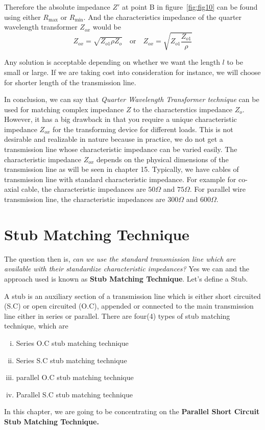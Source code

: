 Therefore the absolute impedance $Z'$ at point B in figure~\ref{fig:fig10} can be found using either $ R_\max$ or $ R_\min$. And the characteristics impedance of the quarter wavelength transformer $Z_{ox}$ would be
\begin{equation*}
Z_{ox}=\sqrt{Z_{o1}\rho Z_o}\quad\text{or}\quad Z_{ox}=\sqrt{Z_{o1}\frac{Z_{o1}}{\rho}}
\end{equation*}

Any solution is acceptable depending on whether we want the length $l$ to be small or large. If we are taking cost into consideration for instance, we will choose for shorter length of the transmission line.

In conclusion, we can say that \textit{Quarter Wavelength Transformer technique} can be used for matching complex impedance $Z$ to the characterstics impedance $Z_o$. However, it has a big drawback in that you require a unique characteristic impedance $Z_{ox}$ for the transforming device for different loads. This is not desirable and realizable in nature because in practice, we do not get a transmission line whose characteristic impedance can be varied easily. The characteristic impedance $Z_{ox}$ depends on the physical dimensions of the transmission line as will be seen in chapter 15. Typically, we have cables of transmission line with standard characteristic impedance. For example for co-axial cable, the characteristic impedances are $50\Omega$ and $75\Omega$. For parallel wire transmission line, the characteristic impedances are $300\Omega$ and $600\Omega$.

\section{Stub Matching Technique}
The question then is, \emph{can we use the standard transmission line which are available with their standardize characteristic impedances?} Yes we can and the approach used is known as \textbf{Stub Matching Technique}. Let's define a Stub.

A stub is an auxiliary section of a transmission line which is either short circuited (S.C) or open circuited (O.C), appended or connected to the main transmission line either in series or parallel. There are four(4) types of stub matching technique, which are
\begin{enumerate}[(i)]
\item Series O.C stub matching technique
\item Series S.C stub matching technique
\item parallel O.C stub matching technique
\item Parallel S.C stub matching technique
\end{enumerate}
In this chapter, we are going to be concentrating on the \textbf{Parallel Short Circuit Stub Matching Technique.}

